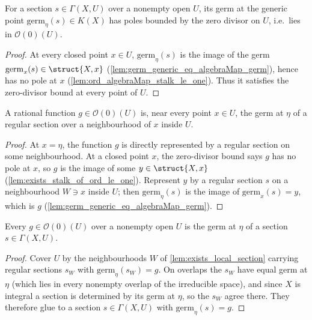\begin{lemma}
  \label{lem:germGenericLinear_mem}
  \leanok
  For a section \(s \in \Gamma(X, U)\) over a nonempty open \(U\), its germ at the generic point
  \(\mathrm{germ}_\eta(s) \in K(X)\) has poles bounded by the zero divisor on \(U\), i.e.\ lies in
  \(\mathcal O(0)(U)\).
\end{lemma}
\begin{proof}
  \leanok
  At every closed point \(x \in U\), \(\mathrm{germ}_\eta(s)\) is the image of the germ
  \(\mathrm{germ}_x(s) \in \struct{X,x}\) (\ref{lem:germ_generic_eq_algebraMap_germ}), hence has no
  pole at \(x\) (\ref{lem:ord_algebraMap_stalk_le_one}). Thus it satisfies the zero-divisor bound at
  every point of \(U\).
\end{proof}

\begin{lemma}
  \label{lem:exists_local_section}
  \leanok
  A rational function \(g \in \mathcal O(0)(U)\) is, near every point \(x \in U\), the germ at
  \(\eta\) of a regular section over a neighbourhood of \(x\) inside \(U\).
\end{lemma}
\begin{proof}
  \leanok
  At \(x = \eta\), the function \(g\) is directly represented by a regular section on some
  neighbourhood. At a closed point \(x\), the zero-divisor bound says \(g\) has no pole at \(x\), so
  \(g\) is the image of some \(y \in \struct{X,x}\) (\ref{lem:exists_stalk_of_ord_le_one}). Represent
  \(y\) by a regular section \(s\) on a neighbourhood \(W \ni x\) inside \(U\); then
  \(\mathrm{germ}_\eta(s)\) is the image of \(\mathrm{germ}_x(s) = y\), which is \(g\)
  (\ref{lem:germ_generic_eq_algebraMap_germ}).
\end{proof}

\begin{lemma}
  \label{lem:exists_section_germ_eq}
  \leanok
  Every \(g \in \mathcal O(0)(U)\) over a nonempty open \(U\) is the germ at \(\eta\) of a section
  \(s \in \Gamma(X, U)\).
\end{lemma}
\begin{proof}
  \leanok
  Cover \(U\) by the neighbourhoods \(W\) of \ref{lem:exists_local_section} carrying regular
  sections \(s_W\) with \(\mathrm{germ}_\eta(s_W) = g\). On overlaps the \(s_W\) have equal germ at
  \(\eta\) (which lies in every nonempty overlap of the irreducible space), and since \(X\) is
  integral a section is determined by its germ at \(\eta\), so the \(s_W\) agree there. They
  therefore glue to a section \(s \in \Gamma(X, U)\) with \(\mathrm{germ}_\eta(s) = g\).
\end{proof}

